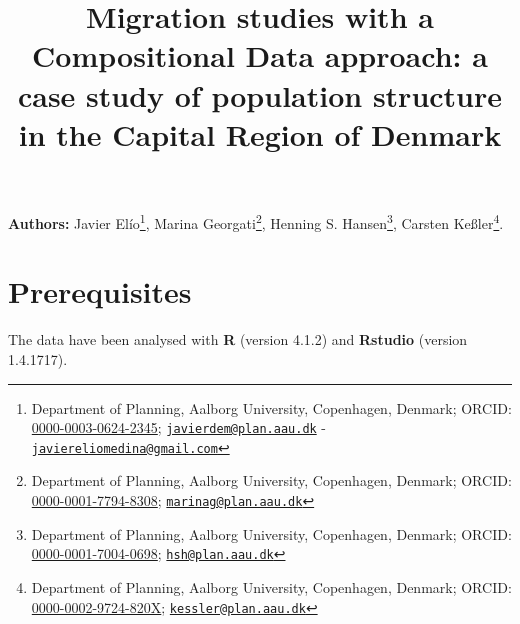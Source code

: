 \documentclass[
  12pt,
]{article}
\title{Migration studies with a Compositional Data approach: a case
study of population structure in the Capital Region of Denmark}
\author{}
\date{\vspace{-2.5em}}
\begin{document}
\maketitle

\textbf{Authors:} Javier Elío\footnote{Department of Planning, Aalborg
  University, Copenhagen, Denmark; ORCID:
  \href{https://orcid.org/0000-0003-0624-2345}{0000-0003-0624-2345};
  \href{mailto:javierdem@plan.aau.dk}{\nolinkurl{javierdem@plan.aau.dk}}
  -
  \href{mailto:javiereliomedina@gmail.com}{\nolinkurl{javiereliomedina@gmail.com}}},
Marina Georgati\footnote{Department of Planning, Aalborg University,
  Copenhagen, Denmark; ORCID:
  \href{https://orcid.org/0000-0001-7794-8308}{0000-0001-7794-8308};
  \href{mailto:marinag@plan.aau.dk}{\nolinkurl{marinag@plan.aau.dk}}},
Henning S. Hansen\footnote{Department of Planning, Aalborg University,
  Copenhagen, Denmark; ORCID:
  \href{https://orcid.org/0000-0001-7004-0698}{0000-0001-7004-0698};
  \href{mailto:hsh@plan.aau.dk}{\nolinkurl{hsh@plan.aau.dk}}}, Carsten
Keßler\footnote{Department of Planning, Aalborg University, Copenhagen,
  Denmark; ORCID:
  \href{https://orcid.org/0000-0002-9724-820X}{0000-0002-9724-820X};
  \href{mailto:kessler@plan.aau.dk}{\nolinkurl{kessler@plan.aau.dk}}}.\\

\hypertarget{prerequisites}{%
\section{Prerequisites}\label{prerequisites}}

The data have been analysed with \textbf{R} (version 4.1.2) and
\textbf{Rstudio} (version 1.4.1717).
\end{document}
